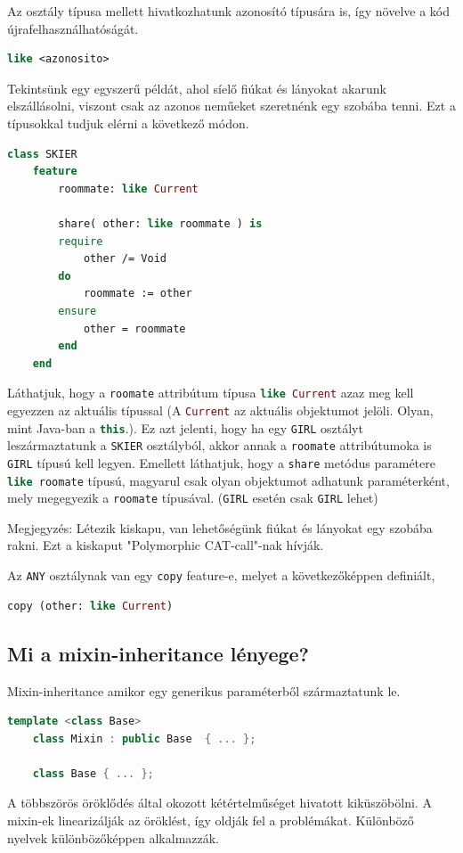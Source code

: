 	Az osztály típusa mellett hivatkozhatunk azonosító típusára is, így növelve a kód újrafelhasználhatóságát.
	\begin{lstlisting}[language=Eiffel]
	like <azonosito>
	\end{lstlisting}
	
	 Tekintsünk egy egyszerű példát, ahol síelő fiúkat és lányokat akarunk elszállásolni, viszont csak az azonos neműeket szeretnénk egy szobába tenni. Ezt a típusokkal tudjuk elérni a következő módon.
	\begin{lstlisting}[language=Eiffel]
	class SKIER
	feature
		roommate: like Current
		
		share( other: like roommate ) is
		require
			other /= Void
		do
			roommate := other
		ensure
			other = roommate
		end
	end
	\end{lstlisting}
	Láthatjuk, hogy a \lstinline[language=Eiffel]|roomate| attribútum típusa \lstinline[language=Eiffel]|like Current| azaz meg kell egyezzen az aktuális típussal (A \lstinline[language=Eiffel]|Current| az aktuális objektumot jelöli. Olyan, mint Java-ban a \lstinline[language=Java]|this|.). Ez azt jelenti, hogy ha egy \lstinline[language=Eiffel]|GIRL| osztályt leszármaztatunk a \lstinline[language=Eiffel]|SKIER| osztályból, akkor annak a \lstinline[language=Eiffel]|roomate| attribútumoka is \lstinline[language=Eiffel]|GIRL| típusú kell legyen. Emellett láthatjuk, hogy a \lstinline[language=Eiffel]|share| metódus paramétere \lstinline[language=Eiffel]|like roomate| típusú, magyarul csak olyan objektumot adhatunk paraméterként, mely megegyezik a \lstinline[language=Eiffel]|roomate| típusával. (\lstinline[language=Eiffel]|GIRL| esetén csak \lstinline[language=Eiffel]|GIRL| lehet)
	
	Megjegyzés: Létezik kiskapu, van lehetőségünk fiúkat és lányokat egy szobába rakni. Ezt a kiskaput "Polymorphic CAT-call"-nak hívják.
	
	Az \lstinline[language=Eiffel]|ANY| osztálynak van egy \lstinline[language=Eiffel]|copy| feature-e, melyet a következőképpen definiált,
	\begin{lstlisting}[language=Eiffel]
	copy (other: like Current)
	\end{lstlisting}
	
\subsection{ Mi a mixin-inheritance lényege? }\label{Mixin}
	Mixin-inheritance amikor egy generikus paraméterből származtatunk le. 
	\begin{lstlisting}[language=C++]
	template <class Base>
	class Mixin : public Base  { ... };
	
	class Base { ... };
	\end{lstlisting}
	A többszörös öröklődés által okozott kétértelműséget hivatott kiküszöbölni. A mixin-ek linearizálják az öröklést, így oldják fel a problémákat. Különböző nyelvek különbözőképpen alkalmazzák.
	

